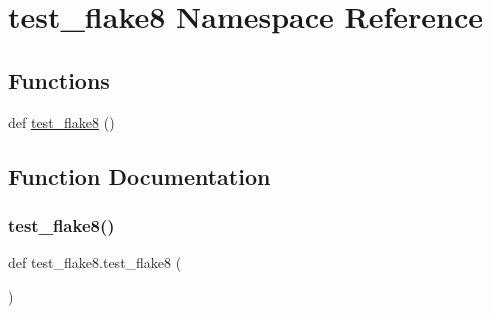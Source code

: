 \hypertarget{namespacetest__flake8}{}\section{test\+\_\+flake8 Namespace Reference}
\label{namespacetest__flake8}
\subsection*{Functions}
\begin{DoxyCompactItemize}
\item 
def \mbox{\hyperlink{namespacetest__flake8_a5f7134c66c7d67087a308de33b8203a0}{test\+\_\+flake8}} ()
\end{DoxyCompactItemize}


\subsection{Function Documentation}
\mbox{\label{namespacetest__flake8_a5f7134c66c7d67087a308de33b8203a0}} 
\subsubsection{\texorpdfstring{test\+\_\+flake8()}{test\_flake8()}}
{\footnotesize\ttfamily def test\+\_\+flake8.\+test\+\_\+flake8 (\begin{DoxyParamCaption}{ }\end{DoxyParamCaption})}

